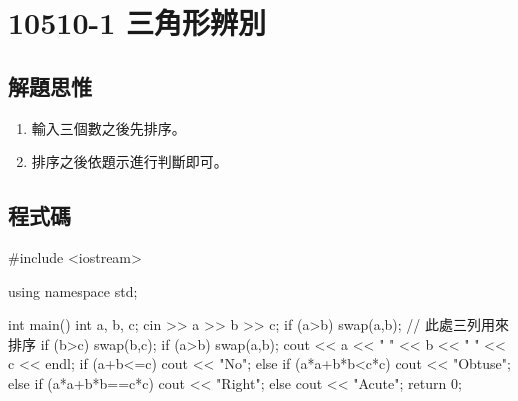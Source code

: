 \section{10510-1 三角形辨別}

\subsection{解題思惟}
\begin{enumerate}
	\item 輸入三個數之後先排序。
	\item 排序之後依題示進行判斷即可。
\end{enumerate}

\subsection{程式碼}
\begin{cppcode}
#include <iostream>

using namespace std;

int main()
{
	int a, b, c;
	cin >> a >> b >> c;
	if (a>b) swap(a,b); // 此處三列用來排序
	if (b>c) swap(b,c);
	if (a>b) swap(a,b);
	cout << a << " " << b << " " << c << endl;
	if (a+b<=c) cout << "No";
	else if (a*a+b*b<c*c) cout << "Obtuse";
	else if (a*a+b*b==c*c) cout << "Right";
	else cout << "Acute";
	return 0;
}
\end{cppcode}
